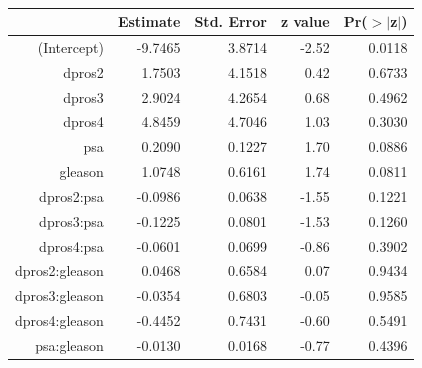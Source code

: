 \documentclass[11pt]{article}\usepackage[]{graphicx}\usepackage[]{color}
\begin{document}
\begin{center}
\begin{table}[ht]
\centering
\begin{tabular}{rrrrr}
  \hline
 & Estimate & Std. Error & z value & Pr($>$$|$z$|$) \\ 
  \hline
(Intercept) & -9.7465 & 3.8714 & -2.52 & 0.0118 \\ 
  dpros2 & 1.7503 & 4.1518 & 0.42 & 0.6733 \\ 
  dpros3 & 2.9024 & 4.2654 & 0.68 & 0.4962 \\ 
  dpros4 & 4.8459 & 4.7046 & 1.03 & 0.3030 \\ 
  psa & 0.2090 & 0.1227 & 1.70 & 0.0886 \\ 
  gleason & 1.0748 & 0.6161 & 1.74 & 0.0811 \\ 
  dpros2:psa & -0.0986 & 0.0638 & -1.55 & 0.1221 \\ 
  dpros3:psa & -0.1225 & 0.0801 & -1.53 & 0.1260 \\ 
  dpros4:psa & -0.0601 & 0.0699 & -0.86 & 0.3902 \\ 
  dpros2:gleason & 0.0468 & 0.6584 & 0.07 & 0.9434 \\ 
  dpros3:gleason & -0.0354 & 0.6803 & -0.05 & 0.9585 \\ 
  dpros4:gleason & -0.4452 & 0.7431 & -0.60 & 0.5491 \\ 
  psa:gleason & -0.0130 & 0.0168 & -0.77 & 0.4396 \\ 
   \hline
\end{tabular}
\caption{} 
\label{reg_summary_int}
\end{table}

\end{center}
\end{document}
